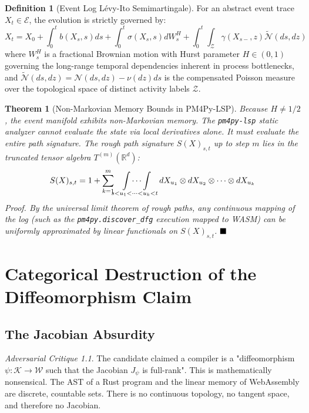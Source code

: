 \documentclass[11pt,a4paper]{book}
\theoremstyle{definition}
\newtheorem{definition}{Definition}[section]
\theoremstyle{plain}
\newtheorem{theorem}{Theorem}[section]
\theoremstyle{remark}
\newtheorem{critique}{Adversarial Critique}[section]
\begin{document}
\begin{definition}[Event Log L\'evy-Ito Semimartingale]
For an abstract event trace $X_t \in \mathcal{E}$, the evolution is strictly governed by:
\begin{equation} \label{eq:jump_diff}
X_t = X_0 + \int_0^t b(X_s, s)ds + \int_0^t \sigma(X_s, s) dW^H_s + \int_0^t \int_{\mathcal{Z}} \gamma(X_{s-}, z) \tilde{\mathcal{N}}(ds, dz)
\end{equation}
where $W^H_s$ is a fractional Brownian motion with Hurst parameter $H \in (0,1)$ governing the long-range temporal dependencies inherent in process bottlenecks, and $\tilde{\mathcal{N}}(ds, dz) = \mathcal{N}(ds, dz) - \nu(dz)ds$ is the compensated Poisson measure over the topological space of distinct activity labels $\mathcal{Z}$.
\end{definition}

\begin{theorem}[Non-Markovian Memory Bounds in PM4Py-LSP]
Because $H \neq 1/2$, the event manifold exhibits non-Markovian memory. The \texttt{pm4py-lsp} static analyzer cannot evaluate the state via local derivatives alone. It must evaluate the entire path signature. The rough path signature $S(X)_{s,t}$ up to step $m$ lies in the truncated tensor algebra $T^{(m)}(\mathbb{R}^d)$:
\begin{equation}
S(X)_{s,t} = 1 + \sum_{k=1}^m \idotsint\limits_{s < u_1 < \dots < u_k < t} dX_{u_1} \otimes dX_{u_2} \otimes \dots \otimes dX_{u_k}
\end{equation}
\textit{Proof.} By the universal limit theorem of rough paths, any continuous mapping of the log (such as the \texttt{pm4py.discover\_dfg} execution mapped to WASM) can be uniformly approximated by linear functionals on $S(X)_{s,t}$. $\hfill\blacksquare$
\end{theorem}

\chapter{Categorical Destruction of the Diffeomorphism Claim}
\section{The Jacobian Absurdity}
\begin{critique}
The candidate claimed a compiler is a "diffeomorphism $\psi: \mathcal{K} \to \mathcal{W}$ such that the Jacobian $J_\psi$ is full-rank". This is mathematically nonsensical. The AST of a Rust program and the linear memory of WebAssembly are discrete, countable sets. There is no continuous topology, no tangent space, and therefore no Jacobian.
\end{critique}
\end{document}
